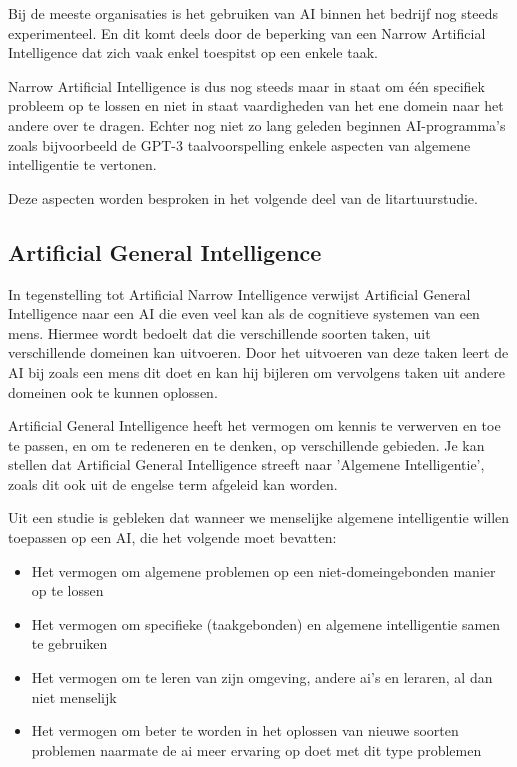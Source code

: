 Bij de meeste organisaties is het gebruiken van AI binnen het bedrijf nog steeds experimenteel. En dit komt deels door de beperking van een Narrow Artificial Intelligence dat zich vaak enkel toespitst op een enkele taak.

Narrow Artificial Intelligence is dus nog steeds maar in staat om één specifiek probleem op te lossen en niet in staat vaardigheden van het ene domein naar het andere over te dragen. Echter nog niet zo lang geleden beginnen AI-programma’s zoals bijvoorbeeld de GPT-3 taalvoorspelling enkele aspecten van algemene intelligentie te vertonen.

\autocite{benbya2020artificial}

Deze aspecten worden besproken in het volgende deel van de litartuurstudie.

\subsection{Artificial General Intelligence}

In tegenstelling tot Artificial Narrow Intelligence verwijst Artificial General Intelligence naar een AI die even veel kan als de cognitieve systemen van een mens. Hiermee wordt bedoelt dat die verschillende soorten taken, uit verschillende domeinen kan uitvoeren. Door het uitvoeren van deze taken leert de AI bij zoals een mens dit doet en kan hij bijleren om vervolgens taken uit andere domeinen ook te kunnen oplossen. 

Artificial General Intelligence heeft het vermogen om kennis te verwerven en toe te passen, en om te redeneren en te denken, op verschillende gebieden. Je kan stellen dat Artificial General Intelligence streeft naar 'Algemene Intelligentie', zoals dit ook uit de engelse term afgeleid kan worden. 

Uit een studie is gebleken dat wanneer we menselijke algemene intelligentie willen toepassen op een AI, die het volgende moet bevatten: \linebreak

\begin{itemize}
    \item Het vermogen om algemene problemen op een niet-domeingebonden manier op te lossen
    \item Het vermogen om specifieke (taakgebonden) en algemene intelligentie samen te gebruiken
    \item Het vermogen om te leren van zijn omgeving, andere ai's en leraren, al dan niet menselijk
    \item Het vermogen om beter te worden in het oplossen van nieuwe soorten problemen naarmate de ai meer ervaring op doet met dit type problemen
\end{itemize}

